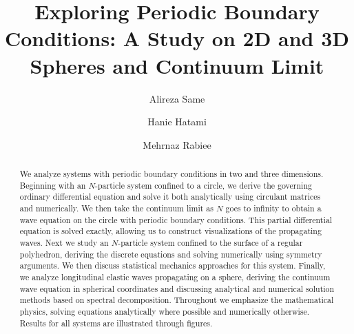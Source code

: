 \documentclass[final,5p,times,twocolumn,authoryear]{elsarticle}
\begin{document}
\begin{frontmatter}



\title{Exploring Periodic Boundary Conditions: A Study on 2D and 3D Spheres and Continuum Limit}


\author[first]{Alireza Same}
\author[second]{Hanie Hatami}
\author[third]{Mehrnaz Rabiee}

\begin{abstract}
We analyze systems with periodic boundary conditions in two and three dimensions. Beginning with an $N$-particle system confined to a circle, we derive the governing ordinary differential equation and solve it both analytically using circulant matrices and numerically. We then take the continuum limit as $N$ goes to infinity to obtain a wave equation on the circle with periodic boundary conditions. This partial differential equation is solved exactly, allowing us to construct visualizations of the propagating waves. Next we study an $N$-particle system confined to the surface of a regular polyhedron, deriving the discrete equations and solving numerically using symmetry arguments. We then discuss statistical mechanics approaches for this system. Finally, we analyze longitudinal elastic waves propagating on a sphere, deriving the continuum wave equation in spherical coordinates and discussing analytical and numerical solution methods based on spectral decomposition. Throughout we emphasize the mathematical physics, solving equations analytically where possible and numerically otherwise. Results for all systems are illustrated through figures.
\end{abstract}


\end{frontmatter}
\end{document}
